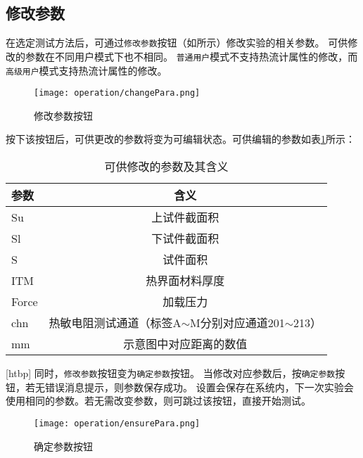 \subsection{修改参数}
在选定测试方法后，可通过\lstinline{修改参数}按钮（如所示）修改实验的相关参数。
可供修改的参数在不同用户模式下也不相同。
\lstinline{普通用户}模式不支持热流计属性的修改，而\lstinline{高级用户}模式支持热流计属性的修改。
\begin{figure}[htbp]
    \centering
    \texttt{[image: operation/changePara.png]}
    \caption{ 修改参数按钮 \label{fig:btnChangePara}}
\end{figure}
按下该按钮后，可供更改的参数将变为可编辑状态。可供编辑的参数如表\ref{tab:editableParaNormalUser}所示：
\begin{table}
    \centering
    \caption{ 可供修改的参数及其含义 \label{tab:editableParaNormalUser}}
    \begin{tabular}{@{}lc@{}}
        \toprule
        参数  & 含义                                                     \\ \midrule
        Su    & 上试件截面积                                             \\
        Sl    & 下试件截面积                                             \\
        S     & 试件面积                                                 \\
        ITM   & 热界面材料厚度                                           \\
        Force & 加载压力                                                 \\
        chn   & 热敏电阻测试通道（标签A$\sim$M分别对应通道201$\sim$213） \\
        mm    & 示意图中对应距离的数值                                   \\ \bottomrule
    \end{tabular}
\end{table}[htbp]
同时，\lstinline{修改参数}按钮变为\lstinline{确定参数}按钮。
当修改对应参数后，按\lstinline{确定参数}按钮，若无错误消息提示，则参数保存成功。
设置会保存在系统内，下一次实验会使用相同的参数。若无需改变参数，则可跳过该按钮，直接开始测试。

\begin{figure}[htbp]
    \centering
    \texttt{[image: operation/ensurePara.png]}
    \caption{ 确定参数按钮 \label{fig:ensurePara}}
\end{figure}

